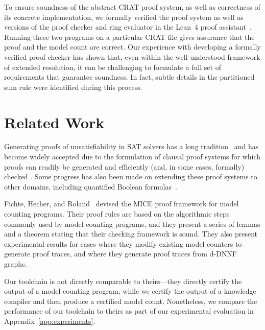 \documentclass[letterpaper,USenglish,cleveref, autoref, thm-restate]{lipics-v2021}
\newcommand{\lean}{Lean~4}
\begin{document}
To ensure soundness of the abstract CRAT proof system, as well as correctness of its
concrete implementation, we formally verified the proof system as well as versions
of the proof checker and ring evaluator in the \lean{} proof assistant~\cite{demoura:cade:2021}.
Running these two programs on a particular CRAT file gives assurance that the proof
and the model count are correct. Our experience with developing a formally verified
proof checker has shown that, even within the well-understood framework of extended
resolution, it can be challenging to formulate a full set of requirements that guarantee soundness.
In fact, subtle details in the partitioned sum rule were identified during this process.

\section{Related Work}

Generating proofs of unsatisfiability in SAT solvers has a long
tradition~\cite{ZhangMalik} and has become widely accepted due to the
formulation of clausal proof systems for which proofs can readily be
generated and efficiently (and, in some cases, formally) checked
\cite{cruz-cade-2017,RAT,Tan:2021,wetzler14_drattrim}.  Some progress
has also been made on extending these proof systems to other domains,
including quantified Boolean
formulas~\cite{bryant:cade:2021,heule:JAR2014}.

Fichte, Hecher, and Roland~\cite{fichte:sat:2022} devised the MICE
proof framework for model counting programs.  Their proof rules are
based on the algorithmic steps commonly used by model counting
programs, and they present a series of lemmas and a theorem stating
that their checking framework is sound.  They also present
experimental results for cases where they modify existing model
counters to generate proof traces, and where they generate proof
traces from d-DNNF graphs.

Our toolchain is not directly
comparable to theirs---they directly certify the output of a model counting
program, while we certify the output of a knowledge compiler and then
produce a certified model count.
Nonetheless,
we compare the performance of our toolchain to theirs as part of our
experimental evaluation in Appendix~\ref{app:experiments}.
\end{document}
